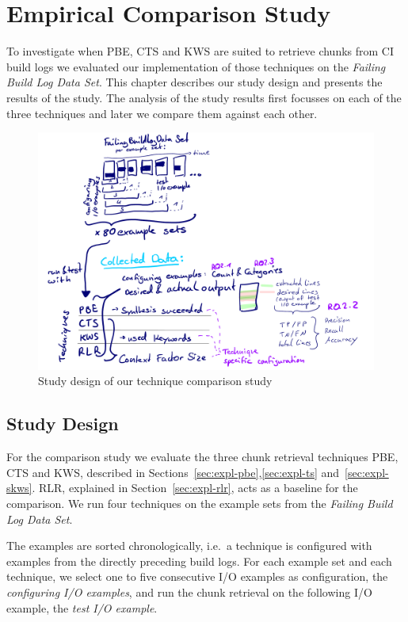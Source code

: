 \documentclass[\myrootdir/main.tex]{subfiles}
\begin{document}
\chapter{Empirical Comparison Study}
\label{sec:study}
To investigate when PBE, CTS and KWS are suited to retrieve chunks from CI build logs we evaluated our implementation of those techniques on the \emph{Failing Build Log Data Set}.
This chapter describes our study design and presents the results of the study.
The analysis of the study results first focusses on each of the three techniques and later we compare them against each other.


\begin{figure}[htbp]
	\centering
	\includegraphics[width=\textwidth, clip]{img/study-design.pdf}
	\caption{Study design of our technique comparison study}
	\label{fig:study}
\end{figure}

\section{Study Design}
For the comparison study we evaluate the three chunk retrieval techniques PBE, CTS and KWS, described in Sections~\ref{sec:expl-pbe},\ref{sec:expl-ts} and~\ref{sec:expl-skws}.
RLR, explained in Section~\ref{sec:expl-rlr}, acts as a baseline for the comparison.
We run four techniques on the example sets from the \emph{Failing Build Log Data Set}.

The examples are sorted chronologically, i.e.\ a technique is configured with examples from the directly preceding build logs.
For each example set and each technique, we select one to five consecutive I/O examples as configuration, the \emph{configuring I/O examples}, and run the chunk retrieval on the following I/O example, the \emph{test I/O example}.
\end{document}
